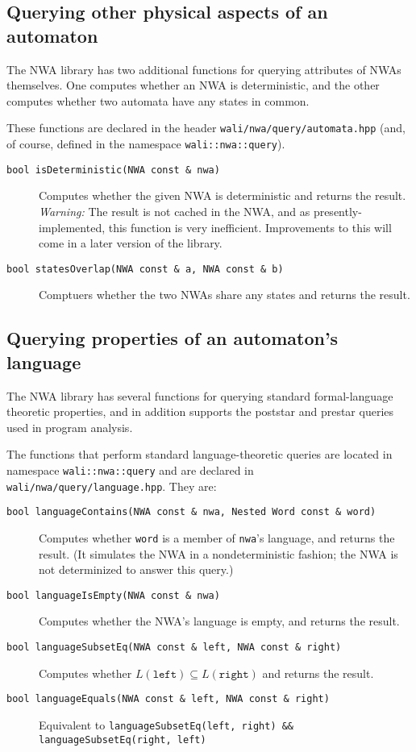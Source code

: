 \restoregeometry


\subsection{Querying other physical aspects of an automaton}
\label{Se:query-automaton}

The NWA library has two additional functions for querying attributes
of NWAs themselves. One computes whether an NWA is deterministic, and
the other computes whether two automata have any states in common.

These functions are declared in the header
\texttt{wali/nwa/query/automata.hpp} (and, of course, defined in the
namespace \texttt{wali::nwa::query}).

\begin{description}
  \item[\texttt{bool isDeterministic(NWA const \& nwa)}]
    Computes whether the given NWA is deterministic and returns the
    result. \textit{Warning:} The result is not cached in the NWA, and
    as presently-implemented, this function is very
    inefficient. Improvements to this will come in a later version of
    the library.
  \item[\texttt{bool statesOverlap(NWA const \& a, NWA const \& b)}]
    Comptuers whether the two NWAs share any states and returns the
    result.
\end{description}


\subsection{Querying properties of an automaton's language}
\label{Se:query-language}

The NWA library has several functions for querying standard
formal-language theoretic properties, and in addition supports
the poststar and prestar queries used in program analysis.

The functions that perform standard language-theoretic queries are
located in namespace \texttt{wali::nwa::query} and are declared in
\texttt{wali/nwa/query/language.hpp}. They are:
\begin{description}
  \item[\texttt{bool languageContains(NWA const \& nwa, Nested Word
    const \& word)}] Computes whether \texttt{word} is a member of
    \texttt{nwa}'s language, and returns the result. (It simulates the
    NWA in a nondeterministic fashion; the NWA is not determinized to answer
    this query.)
  \item[\texttt{bool languageIsEmpty(NWA const \& nwa)}] Computes
    whether the NWA's language is empty, and returns the result.
  \item[\texttt{bool languageSubsetEq(NWA const \& left, NWA const \& right)}]
    Computes whether $L(\texttt{left}) \subseteq L(\texttt{right})$
    and returns the result.
  \item[\texttt{bool languageEquals(NWA const \& left, NWA const \& right)}]
    Equivalent to \texttt{languageSubsetEq(left, right) \&\&
    languageSubsetEq(right, left)}
\end{description}

